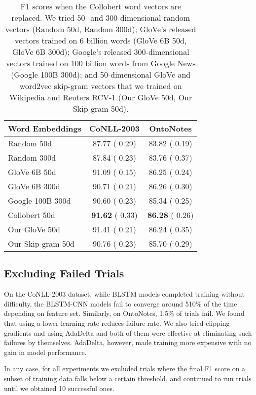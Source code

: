 \documentclass[11pt,letterpaper]{article}
\begin{document}
\begin{table}[t!]
\begin{center}
\small
\begin{tabular}{|l|c|c|}
\hline \bf Word Embeddings & \bf CoNLL-2003 & \bf OntoNotes \\ \hline
Random 50d       & 87.77 ( 0.29) & 83.82 ( 0.19) \\
Random 300d      & 87.84 ( 0.23) & 83.76 ( 0.37) \\
GloVe 6B 50d     & 91.09 ( 0.15) & 86.25 ( 0.24) \\
GloVe 6B 300d    & 90.71 ( 0.21) & 86.26 ( 0.30) \\
Google 100B 300d & 90.60 ( 0.23) & 85.34 ( 0.25) \\ \hline
Collobert 50d    & {\bf 91.62} ( 0.33) & {\bf 86.28} ( 0.26) \\
Our GloVe 50d    & 91.41 ( 0.21) & 86.24 ( 0.35) \\
Our Skip-gram 50d & 90.76 ( 0.23) & 85.70 ( 0.29) \\
\hline
\end{tabular}
\end{center}
\caption{
F1 scores when the Collobert word vectors are replaced. We tried 50- and 300-dimensional random vectors (Random 50d, Random 300d); GloVe's released vectors trained on 6 billion words (GloVe 6B 50d, GloVe 6B 300d); Google's released 300-dimensional vectors trained on 100 billion words from Google News (Google 100B 300d); and 50-dimensional GloVe and word2vec skip-gram vectors that we trained on Wikipedia and Reuters RCV-1 (Our GloVe 50d, Our Skip-gram 50d).
}
\label{tab:wordvec-res}
\end{table}

\subsection{Excluding Failed Trials}
\label{sec:failed-trials}
On the CoNLL-2003 dataset, while BLSTM models completed training without difficulty, the BLSTM-CNN models fail to converge around 510\% of the time depending on feature set. Similarly, on OntoNotes, 1.5\% of trials fail. We found that using a lower learning rate
reduces failure rate. We also tried clipping gradients and using AdaDelta and both of them were effective at eliminating such failures by themselves.
AdaDelta, however, made training more expensive with no gain in model performance.

In any case, for all experiments we excluded trials where the final F1 score on a subset of training data falls below a certain threshold, and continued to run trials until we obtained 10 successful ones. 
\end{document}
